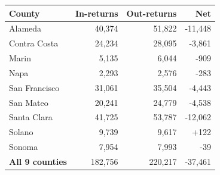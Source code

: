 \begin{tabular}{lrrr}
\toprule
County & In-returns & Out-returns & Net \\
\midrule
Alameda & 40,374 & 51,822 & -11,448 \\
Contra Costa & 24,234 & 28,095 & -3,861 \\
Marin & 5,135 & 6,044 & -909 \\
Napa & 2,293 & 2,576 & -283 \\
San Francisco & 31,061 & 35,504 & -4,443 \\
San Mateo & 20,241 & 24,779 & -4,538 \\
Santa Clara & 41,725 & 53,787 & -12,062 \\
Solano & 9,739 & 9,617 & +122 \\
Sonoma & 7,954 & 7,993 & -39 \\
\midrule
\textbf{All 9 counties} & 182,756 & 220,217 & -37,461 \\
\bottomrule
\end{tabular}
